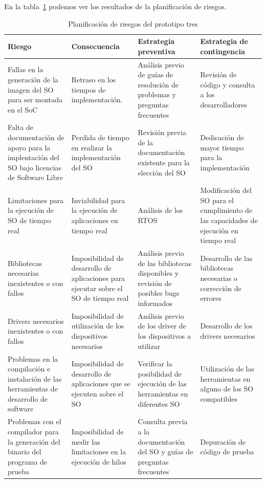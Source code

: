 \newpage
En la tabla~\ref{tab:planificación3} podemos ver los resultados de la planificación de riesgos.
 		\begin{table}[h!]
		\centering
		\begin{tabular}{ p{4cm} p{4cm} p{4cm} p{3cm} }
		\hline 
		\rowcolor[gray]{0.8} Riesgo & Consecuencia & Estrategia preventiva & Estrategia de contingencia\\
		\hline
		Fallas en la generación de la imagen del SO para ser montada en el SoC &Retraso en los tiempos de implementación.& Análisis previo de guías de resolución de problemas y preguntas frecuentes & Revisión de código y consulta a los desarrolladores\\		 
		\hline
		Falta de documentación de apoyo para la implentación del SO bajo licencias de Software Libre& Perdida de tiempo en realizar la implementación del SO & Revisión previa de la documentación existente para la elección del
SO & Dedicación de mayor tiempo para la implementación\\ 
		\hline
		 Limitaciones para la ejecución de SO de tiempo real & Inviabilidad para la ejecución
de aplicaciones en tiempo real & Análisis de los RTOS &Modificación del SO para el cumplimiento de las capacidades de ejecución en tiempo real\\
		\hline
		Bibliotecas necesarias inexistentes o con fallos& Imposibilidad de desarrollo de aplicaciones para ejecutar sobre el SO de tiempo real& Análisis previo de las bibliotecas disponibles y revisión de posibles bugs informados& Desarrollo de las bibliotecas necesarias o corrección de errores\\			
		\hline
		Drivers necesarios inexistentes o con fallos & Imposibilidad de utilización
de los dispositivos necesarios&Análisis previo de los driver de los dispositivos a utilizar& Desarrollo de los drivers necesarios\\		
		\hline
		 Problemas en la compilación e instalación de las herramientas de desarrollo de software & Imposibilidad de desarrollo de aplicaciones que se ejecuten sobre el SO& Verificar la posibilidad de ejecución de las herramientas
en diferentes SO & Utilización de las herramientas en alguno de los SO compatibles\\
		\hline
		 Problemas con el compilador para la generación del binario del programa de prueba& Imposibilidad de medir las limitaciones en la ejecución de hilos & Consulta previa a la documentación del SO y guías de preguntas frecuentes & Depuración de código de prueba\\
		\hline
		\end{tabular}
		\caption{Planificación de riesgos del prototipo tres}
		\label{tab:planificación3}
		\end{table}

